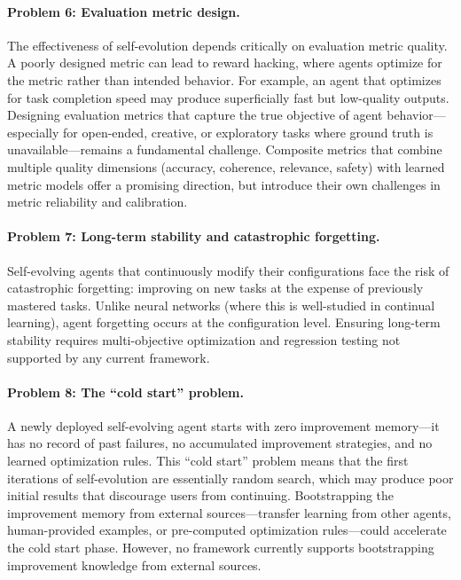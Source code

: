 \paragraph{Problem 6: Evaluation metric design.}
The effectiveness of self-evolution depends critically on evaluation metric quality. A poorly designed metric can lead to reward hacking, where agents optimize for the metric rather than intended behavior. For example, an agent that optimizes for task completion speed may produce superficially fast but low-quality outputs. Designing evaluation metrics that capture the true objective of agent behavior---especially for open-ended, creative, or exploratory tasks where ground truth is unavailable---remains a fundamental challenge. Composite metrics that combine multiple quality dimensions (accuracy, coherence, relevance, safety) with learned metric models offer a promising direction, but introduce their own challenges in metric reliability and calibration.

\paragraph{Problem 7: Long-term stability and catastrophic forgetting.}
Self-evolving agents that continuously modify their configurations face the risk of catastrophic forgetting: improving on new tasks at the expense of previously mastered tasks. Unlike neural networks (where this is well-studied in continual learning), agent forgetting occurs at the configuration level. Ensuring long-term stability requires multi-objective optimization and regression testing not supported by any current framework.

\paragraph{Problem 8: The ``cold start'' problem.}
A newly deployed self-evolving agent starts with zero improvement memory---it has no record of past failures, no accumulated improvement strategies, and no learned optimization rules. This ``cold start'' problem means that the first iterations of self-evolution are essentially random search, which may produce poor initial results that discourage users from continuing. Bootstrapping the improvement memory from external sources---transfer learning from other agents, human-provided examples, or pre-computed optimization rules---could accelerate the cold start phase. However, no framework currently supports bootstrapping improvement knowledge from external sources.

